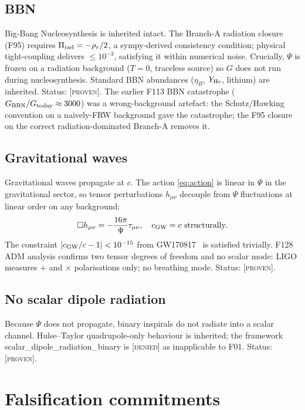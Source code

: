 \documentclass[aps,prd,twocolumn,nofootinbib,floatfix,superscriptaddress]{revtex4-2}
\newcommand{\PROVEN}{{\color{black!75!green}\textsc{[proven]}}}
\begin{document}
\subsection{BBN}

Big-Bang Nucleosynthesis is inherited intact. The Branch-A radiation
closure (F95) requires $\Pi_{\rm rad}=-\rho_r/2$, a sympy-derived
consistency condition; physical tight-coupling delivers $\leq 10^{-3}$,
satisfying it within numerical noise. Crucially, $\Psi$ is frozen on a
radiation background ($T=0$, traceless source) so $G$ does not run
during nucleosynthesis. Standard BBN abundances ($\eta_B$,
$Y_{\rm He}$, lithium) are inherited. Status: \PROVEN. The earlier
F113 BBN catastrophe ($G_{\rm BBN}/G_{\rm today}\approx 3000$) was a
wrong-background artefact: the Schutz/Hawking convention on a
naively-FRW background gave the catastrophe; the F95 closure
on the correct radiation-dominated Branch-A removes it.

\subsection{Gravitational waves}

Gravitational waves propagate at $c$. The action \eqref{eq:action}
is linear in $\Psi$ in the gravitational sector, so tensor
perturbations $h_{\mu\nu}$ decouple from $\Psi$ fluctuations at
linear order on any background:
\begin{equation}
\Box h_{\mu\nu} = -\frac{16\pi}{\Psi}\tau_{\mu\nu},
\quad c_{\rm GW}=c \text{ structurally}.
\end{equation}
The constraint $|c_{\rm GW}/c-1|<10^{-15}$ from
GW170817~\cite{LIGO2017} is satisfied trivially.
F128 ADM analysis confirms two tensor degrees of freedom and no
scalar mode: LIGO measures $+$ and $\times$ polarisations only;
no breathing mode. Status: \PROVEN.

\subsection{No scalar dipole radiation}

Because $\Psi$ does not propagate, binary inspirals do not radiate
into a scalar channel. Hulse--Taylor quadrupole-only behaviour is
inherited; the framework \textsf{scalar\_dipole\_radiation\_binary}
is \textsc{[denied]} as inapplicable to F01. Status: \PROVEN.

\section{Falsification commitments}
\label{sec:falsification}
\end{document}
